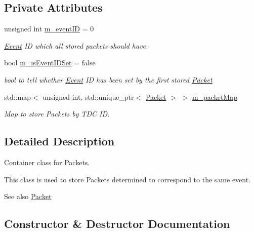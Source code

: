 \subsection*{Private Attributes}
\begin{DoxyCompactItemize}
\item 
unsigned int \hyperlink{class_event_af0c352ab6a128f9df56b231d941aff25}{m\+\_\+event\+ID} = 0
\begin{DoxyCompactList}\small\item\em \hyperlink{class_event}{Event} ID which all stored packets should have. \end{DoxyCompactList}\item 
bool \hyperlink{class_event_a3b435b2fe840647c01ae0ee838b66a54}{m\+\_\+is\+Event\+I\+D\+Set} = false
\begin{DoxyCompactList}\small\item\em bool to tell whether \hyperlink{class_event}{Event} ID has been set by the first stored \hyperlink{class_packet}{Packet} \end{DoxyCompactList}\item 
std\+::map$<$ unsigned int, std\+::unique\+\_\+ptr$<$ \hyperlink{class_packet}{Packet} $>$ $>$ \hyperlink{class_event_a6aabddb7af6189a884d8eacd582bc10f}{m\+\_\+packet\+Map}
\begin{DoxyCompactList}\small\item\em Map to store Packets by T\+DC ID. \end{DoxyCompactList}\end{DoxyCompactItemize}


\subsection{Detailed Description}
Container class for Packets. 

This class is used to store Packets determined to correspond to the same event.

\begin{DoxySeeAlso}{See also}
\hyperlink{class_packet}{Packet} 
\end{DoxySeeAlso}


\subsection{Constructor \& Destructor Documentation}
\mbox{\label{class_event_a6e0319cd5e7b0e8b232e3c829c2ad00c}} 
